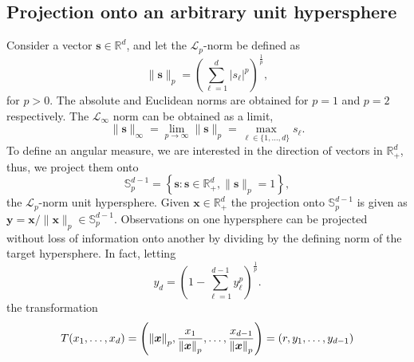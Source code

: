 \subsection{Projection onto an arbitrary unit hypersphere\label{subsec:projection}}


Consider a vector $\bm{s} \in {\mathbb R}^d$, and let the $\mathcal{L}_p$-norm be defined as
  \begin{equation*}
    \lVert \bm{s} \rVert_p = \left({\textstyle\sum}_{\ell = 1}^d \lvert s_{\ell}\rvert^p\right)^{\frac{1}{p}},
  \end{equation*}
for $p>0$. The absolute and Euclidean norms are obtained for $p=1$ and $p=2$ respectively. 
The $\mathcal{L}_{\infty}$ norm can be obtained as a limit, 
  \begin{equation*}
    \lVert \bm{s} \rVert_{\infty}
      = \lim\limits_{p\to\infty} \lVert \bm{s} \rVert_p
      = \max_{\ell\in\lbrace1,\ldots,d\rbrace}s_{\ell}.
  \end{equation*}
To define an angular measure,  we are interested in the direction of
vectors in ${\mathbb R}_{+}^d$, thus, we project them onto
  \begin{equation*}
    {\mathbb S}_{p}^{d-1} = \left\lbrace \bm{s} : \bm{s} \in {\mathbb R}_{+}^{d}, \lVert \bm{s}\rVert_{p} = 1\right\rbrace,
  \end{equation*}
  the $\mathcal{L}_p$-norm unit hypersphere.
  Given $\bm{x}\in {\mathbb R}^d_+$ the projection onto ${\mathbb S}_{p}^{d-1}$ is given as
  $\bm{y} = \bm{x} / \lVert \bm{x}\rVert_p \in {\mathbb S}_{p}^{d-1}$.
  Observations on one hypersphere can be projected without loss of information onto another by
  dividing by the defining norm of the target hypersphere. In fact, letting 
  \begin{equation*}
    y_d = \left(1 - {\textstyle\sum}_{\ell = 1}^{d-1}y_{\ell}^p\right)^{\frac{1}{p}}.
  \end{equation*}
  the transformation
  \begin{equation}
    \label{eqn:pnormt}
    T(x_1,\ldots,x_d) = \left(\pnorm{\bm{x}}{p}, \frac{x_1}{\pnorm{\bm{x}}{p}},
                          \ldots , \frac{x_{d-1}}{\pnorm{\bm{x}}{p}}\right) = (r,y_1,\ldots,y_{d-1})
  \end{equation}
